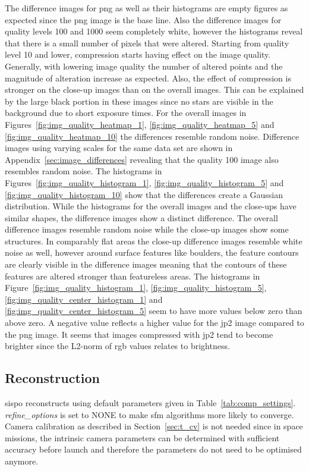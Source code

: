 The difference images for \gls{png} as well as their histograms are empty figures as expected since the \gls{png} image is the base line. Also the difference images for quality levels 100 and 1000 seem completely white, however the histograms reveal that there is a small number of pixels that were altered. 
Starting from quality level 10 and lower, compression starts having effect on the image quality. Generally, with lowering image quality the number of altered points and the magnitude of alteration increase as expected. Also, the effect of compression is stronger on the close-up images than on the overall images. This can be explained by the large black portion in these images since no stars are visible in the background due to short exposure times. For the overall images in Figures~\ref{fig:img_quality_heatmap_1}, \ref{fig:img_quality_heatmap_5} and \ref{fig:img_quality_heatmap_10} the differences resemble random noise. Difference images using varying scales for the same data set are shown in Appendix~\ref{sec:image_differences} revealing that the quality 100 image also resembles random noise. The histograms in Figures~\ref{fig:img_quality_histogram_1}, \ref{fig:img_quality_histogram_5} and \ref{fig:img_quality_histogram_10} show that the differences create a Gaussian distribution. While the histograms for the overall images and the close-ups have similar shapes, the difference images show a distinct difference. The overall difference images resemble random noise while the close-up images show some structures. In comparably flat areas the close-up difference images resemble white noise as well, however around surface features like boulders, the feature contours are clearly visible in the difference images meaning that the contours of these features are altered stronger than featureless areas.
The histograms in Figure~\ref{fig:img_quality_histogram_1}, \ref{fig:img_quality_histogram_5}, \ref{fig:img_quality_center_histogram_1} and \ref{fig:img_quality_center_histogram_5} seem to have more values below zero than above zero. A negative value reflects a higher value for the \gls{jp2} image compared to the \gls{png} image. It seems that images compressed with \gls{jp2} tend to become brighter since the L2-norm of \gls{rgb} values relates to brightness.

\subsection{Reconstruction}
\gls{sispo} reconstructs using default parameters given in Table~\ref{tab:comp_settings}. \textit{refine\_options} is set to NONE to make \gls{sfm} algorithms more likely to converge. Camera calibration as described in Section~\ref{sec:t_cv} is not needed since in space missions, the intrinsic camera parameters can be determined with sufficient accuracy before launch and therefore the parameters do not need to be optimised anymore.

